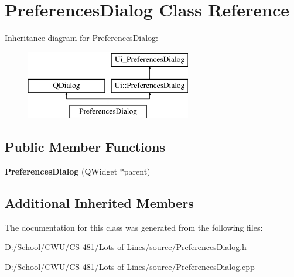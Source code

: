 \hypertarget{class_preferences_dialog}{}\section{Preferences\+Dialog Class Reference}
\label{class_preferences_dialog}
Inheritance diagram for Preferences\+Dialog\+:\begin{figure}[H]
\begin{center}
\leavevmode
\includegraphics[height=3.000000cm]{class_preferences_dialog}
\end{center}
\end{figure}
\subsection*{Public Member Functions}
\begin{DoxyCompactItemize}
\item 
{\bfseries Preferences\+Dialog} (Q\+Widget $\ast$parent)\hypertarget{class_preferences_dialog_ab98d8a3516f8ecb7e117b87e13827180}{}\label{class_preferences_dialog_ab98d8a3516f8ecb7e117b87e13827180}

\end{DoxyCompactItemize}
\subsection*{Additional Inherited Members}


The documentation for this class was generated from the following files\+:\begin{DoxyCompactItemize}
\item 
D\+:/\+School/\+C\+W\+U/\+C\+S 481/\+Lots-\/of-\/\+Lines/source/Preferences\+Dialog.\+h\item 
D\+:/\+School/\+C\+W\+U/\+C\+S 481/\+Lots-\/of-\/\+Lines/source/Preferences\+Dialog.\+cpp\end{DoxyCompactItemize}
